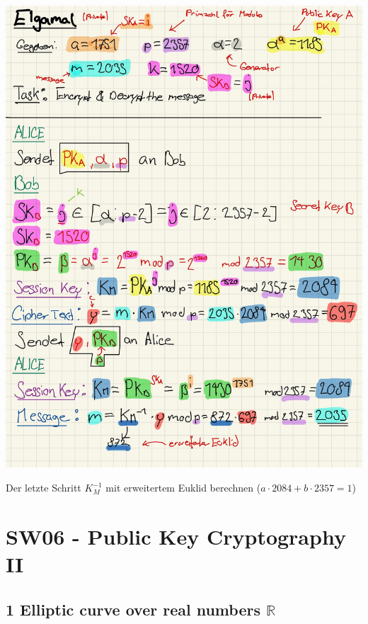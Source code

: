 \documentclass[11pt]{article}
\begin{document}
\begin{center}
	\includegraphics[scale=0.85]{img/psol6_2.jpg}
\end{center}

Der letzte Schritt \(K_{M}^{-1}\) mit erweitertem Euklid berechnen
(\(a \cdot 2084 + b \cdot 2357 = 1\))

    

    \hypertarget{sw06---public-key-cryptography-ii}{%
\section{SW06 - Public Key Cryptography
II}\label{sw06---public-key-cryptography-ii}}

    \hypertarget{elliptic-curve-over-real-numbers-mathbbr}{%
\subsection{\texorpdfstring{1 Elliptic curve over real numbers
\(\mathbb{R}\)}{1 Elliptic curve over real numbers \textbackslash{}mathbb\{R\}}}\label{elliptic-curve-over-real-numbers-mathbbr}}
\end{document}
